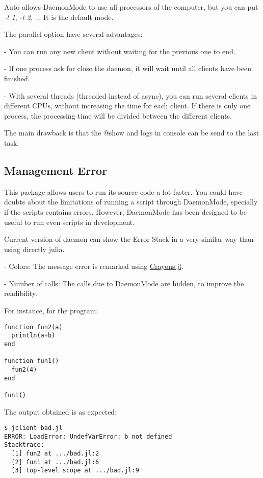 \documentclass{juliacon}
\begin{document}
Auto allows DaemonMode to use all processors of the computer, but you can put
\textit{-t 1}, \textit{-t 2}, ... It is the default mode.


The parallel option have several advantages:

- You can run any new client without waiting for the previous one to end.

- If one process ask for close the daemon, it will wait until all clients have
  been finished.
  
- With several threads (threaded instead of async), you can run several clients in
  different CPUs, without increasing the time for each client. If there is only
  one process, the processing time will be divided between the different
  clients.
 
The main drawback is that the @show and logs in console can be send to the last task.

\subsection{Management Error}

This package allows users to run its source code a lot faster. You could
have doubts about the limitations of running a script through DaemonMode,
specially if the scripts contains errors.
However, DaemonMode has been designed to be useful to run even scripts in development.

Current version of daemon can show the Error Stack in a very similar way than
using directly julia. 

- Colors: The message error is remarked using
\href{https://github.com/KristofferC/Crayons.jl}{Crayons.jl}. 

- Number of calls: The calls due to DaemonMode are hidden, to improve  the readibility.

For instance, for the program:

\begin{lstlisting}
function fun2(a)
  println(a+b)
end

function fun1()
  fun2(4)
end

fun1()
\end{lstlisting}

The output obtained is as expected:

\begin{lstlisting}
$ jclient bad.jl
ERROR: LoadError: UndefVarError: b not defined
Stacktrace:
  [1] fun2 at .../bad.jl:2
  [2] fun1 at .../bad.jl:6
  [3] top-level scope at .../bad.jl:9 
\end{lstlisting}
\end{document}
